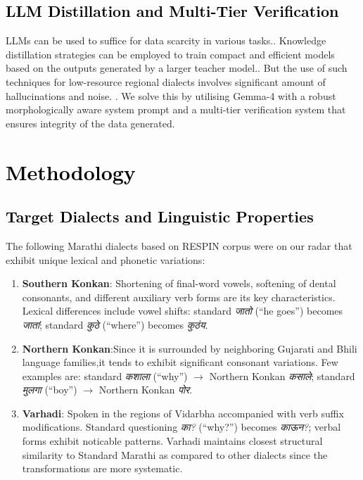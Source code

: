 \subsection{\textcolor{black}{LLM Distillation and Multi-Tier Verification}}

LLMs can be used to suffice for data scarcity in various tasks.\cite{wang2022selfinstruct,taori2023alpaca,mukherjee2023orca}. 
Knowledge distillation strategies can be employed to train compact and efficient models based on the outputs generated by a larger teacher model.\cite{ho2023distilling,pecher2023better,degibert2024scaling}. 
But the use of such techniques for low-resource regional dialects involves significant amount of hallucinations and noise. \cite{ji2023survey,degibert2024scaling}.
We solve this by utilising Gemma-4 with a robust morphologically aware system prompt and a multi-tier verification system that ensures integrity of the data generated.  

\section{\textcolor{black}{Methodology}}
\label{sec:methodology}

\subsection{\textcolor{black}{Target Dialects and Linguistic Properties}}

The following Marathi dialects based on RESPIN corpus were on our radar that exhibit unique lexical and phonetic variations:
\begin{enumerate}
    \item \textbf{Southern Konkan}: Shortening of final-word vowels, softening of dental consonants, and different auxiliary verb forms are its key characteristics. 
    Lexical differences include vowel shifts: standard \emph{जातो} (``he goes'') becomes \emph{जातां}; standard \emph{कुठे} (``where'') becomes \emph{कुठंय}. 
    \item \textbf{Northern Konkan}:Since it is surrounded by neighboring Gujarati and Bhili language families,it tends to exhibit significant consonant variations.
    Few examples are: standard \emph{कशाला} (``why'') $\rightarrow$ Northern Konkan \emph{कसाले}; standard \emph{मुलगा} (``boy'') $\rightarrow$ Northern Konkan \emph{पोर}.
    \item \textbf{Varhadi}: Spoken in the regions of Vidarbha accompanied with verb suffix modifications.
    Standard questioning \emph{का?} (``why?'') becomes \emph{काऊन?}; verbal forms exhibit noticable patterns. 
    Varhadi maintains closest structural similarity to Standard Marathi as compared to other dialects since the transformations are more systematic.
\end{enumerate}

